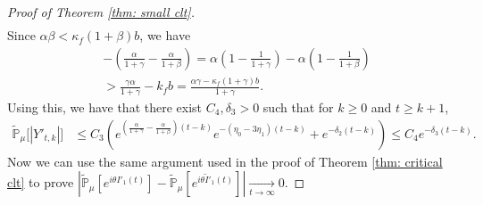 \documentclass[12pt,a4paper]{amsart}
\theoremstyle{plain}
\theoremstyle{definition}
\numberwithin{equation}{section}
\begin{document}
\begin{proof}[Proof of Theorem \ref{thm: small clt}]
\begin{align}
\end{align}
    Since $\alpha\beta<\kappa_f(1+\beta)b$,  we have
\begin{align}
\label{eq: condition for supercritical}
	&-(\frac{\alpha}{1+\gamma}-\frac{\alpha}{1+\beta})
    = \alpha(1-\frac{1}{1+\gamma}) - \alpha(1-\frac{1}{1+\beta})
    \\&> \frac{\gamma \alpha}{1+\gamma} - k_f b
    =\frac{\alpha \gamma-\kappa_f(1+\gamma)b}{1+\gamma}.
\end{align}
Using this, we have that there exist $C_4,
    \delta_3 > 0$ such that for $k\geq 0$ and $t\geq k+1$,
\begin{align}
    \mathbb{\widetilde{P}}_{\mu}\big[|Y'_{t,k}|\big]
    & \leq C_3( e^{(\frac{\alpha}{1+\gamma} - \frac{\alpha}{1+\beta})(t-k)}e^{-(\eta_0 - 3\eta_1)(t-k)}+ e^{-\delta_2(t-k)})
    \leq C_4e^{-\delta_3 (t-k)}.
\end{align}
    Now we can  use the  same argument used in the proof of Theorem \ref{thm: critical clt} to prove $|\mathbb{\widetilde{P}}_{\mu}[e^{i\theta I'_1(t)}]-\mathbb{\widetilde{P}}_{\mu}[e^{i\theta\widetilde I'_1(t)}]|\xrightarrow[t\to \infty]{} 0$.


\end{proof}
\end{document}
